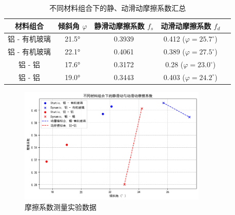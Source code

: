 

\begin{table}[h!]
    \centering
    \renewcommand{\arraystretch}{1.5}
    \setlength{\tabcolsep}{10pt}
    \begin{tabular}{|c|c|c|c|c|}
    \hline
    材料组合 & 倾斜角 $\varphi$ & 静滑动摩擦系数 $f_s$ & 动滑动摩擦系数 $f_d$ \\
    \hline
    铝 - 有机玻璃 & 21.5° & 0.3939 & 0.412 ($\varphi=25.7^\circ$) \\
    铝 - 有机玻璃 & 22.1° & 0.4061 & 0.389 ($\varphi=27.5^\circ$) \\
    铝 - 铝 & 17.6° & 0.3172 & 0.28 ($\varphi=23.0^\circ$) \\
    铝 - 铝 & 19.0° & 0.3443 & 0.403 ($\varphi=24.2^\circ$) \\
    \hline
    \end{tabular}
    \caption{不同材料组合下的静、动滑动摩擦系数汇总}
    \label{tab:friction_summary}
\end{table}

\begin{figure}
    \centering
    \includegraphics[width=0.8\textwidth]{image/output.png}
    \caption{摩擦系数测量实验数据}
    \label{fig:friction_experiment}
\end{figure}
\newpage
